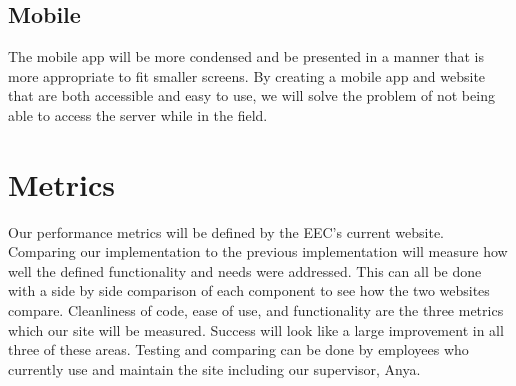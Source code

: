 \documentclass[letterpaper,10pt,titlepage,draftclsnofoot,onecolumn]{IEEEtran}
\begin{document}
\subsection{Mobile}

The mobile app will be more condensed and be presented in a manner that is more appropriate to fit smaller screens. By creating a mobile app and website that are both accessible and easy to use, we will solve the problem of not being able to access the server while in the field. 


\section{Metrics}

Our performance metrics will be defined by the EEC’s current website. Comparing our implementation to the previous implementation will measure how well the defined functionality and needs were addressed. This can all be done with a side by side comparison of each component to see how the two websites compare. Cleanliness of code, ease of use, and functionality are the three metrics which our site will be measured. Success will look like a large improvement in all three of these areas. Testing and comparing can be done by employees who currently use and maintain the site including our supervisor, Anya. 
\end{document}
